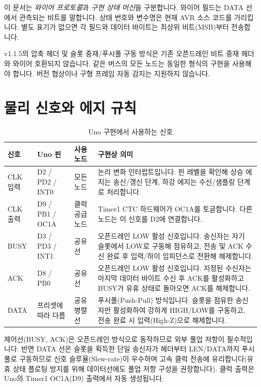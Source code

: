\documentclass[a4paper,9pt]{extarticle}
\begin{document}
이 문서는 \emph{와이어 프로토콜}과 \emph{구현 상태 머신}을 구분합니다. 와이어 필드는 DATA 선에서 관측되는 비트를 말합니다. 상태 번호와 변수명은 현재 AVR 소스 코드를 가리킵니다. 별도 표기가 없으면 각 필드와 데이터 바이트는 최상위 비트(MSB)부터 전송합니다.

\begin{tcolorbox}[colback=lightblue,colframe=blue,title=호환성 주의]
v1.1.5의 압축 헤더 및 슬롯 중재/푸시풀 구동 방식은 기존 오픈드레인 비트 중재 헤더와 와이어 호환되지 않습니다. 같은 버스의 모든 노드는 동일한 형식의 구현을 사용해야 합니다. 버전 협상이나 구형 프레임 자동 감지는 지원하지 않습니다.
\end{tcolorbox}

\section{물리 신호와 에지 규칙}
\begin{table}[h]
\centering\small
\caption{Uno 구현에서 사용하는 신호}
\begin{tabularx}{\linewidth}{@{}l l l Y@{}}\toprule
신호 & Uno 핀 & 사용 노드 & 구현상 의미 \\\midrule
CLK 입력 & D2 / PD2 / INT0 & 모든 노드 & 논리 변화 인터럽트입니다. 핀 레벨을 확인해 상승 에지는 송신/갱신 단계, 하강 에지는 수신/샘플링 단계로 처리합니다. \\
CLK 출력 & D9 / PB1 / OC1A & 클럭 공급 노드 & Timer1 CTC 하드웨어가 OC1A를 토글합니다. 다른 노드는 이 신호를 D2에 연결합니다. \\
BUSY & D3 / PD3 / INT1 & 공유 선 & 오픈드레인 LOW 활성 신호입니다. 송신자는 자기 슬롯에서 LOW로 구동해 점유하고, 전송 및 ACK 수신 완료 후 입력/하이 임피던스로 전환해 해제합니다. \\
ACK & D8 / PB0 & 공유 선 & 오픈드레인 LOW 활성 신호입니다. 지정된 수신자는 마지막 데이터 바이트 수신 후 ACK를 활성화하고 BUSY가 유휴 상태로 돌아오면 ACK를 해제합니다. \\
DATA & 프리셋에 따라 다름 & 공유 병렬 선 & 푸시풀(Push-Pull) 방식입니다. 슬롯을 점유한 송신자만 활성화하여 강하게 HIGH/LOW를 구동하고, 전송 완료 시 입력(High-Z)으로 해제합니다. \\\bottomrule
\end{tabularx}
\end{table}

제어선(BUSY, ACK)은 오픈드레인 방식으로 동작하므로 외부 풀업 저항이 필수적입니다. 반면 DATA 선은 슬롯을 획득한 단일 송신자가 헤더부터 LEN/DATA까지 푸시풀로 구동하므로 신호 슬루율(Slew-rate)이 우수하며 고속 클럭 전송에 유리합니다(유휴 상태 플로팅 방지를 위해 데이터선에도 풀업 저항 구성을 권장합니다). 클럭 출력은 Uno의 Timer1 OC1A(D9) 출력에서 자동 생성됩니다.
\end{document}
